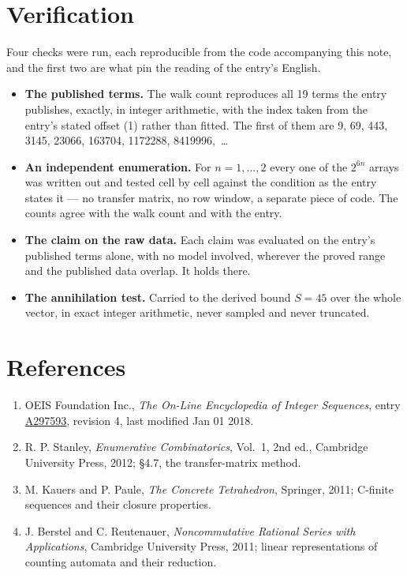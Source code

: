 \documentclass[11pt]{article}
\theoremstyle{definition}
\begin{document}
\section{Verification}

Four checks were run, each reproducible from the code accompanying this note, and the first two are what pin the reading of the entry's English.

\begin{itemize}

\item {\bfseries The published terms.} The walk count reproduces all 19 terms the entry publishes, exactly, in integer arithmetic, with the index taken from the entry's stated offset (1) rather than fitted. The first of them are 9, 69, 443, 3145, 23066, 163704, 1172288, 8419996,~\dots

\item {\bfseries An independent enumeration.} For $n = 1,\dots,2$ every one of the $2^{6n}$ arrays was written out and tested cell by cell against the condition as the entry states it --- no transfer matrix, no row window, a separate piece of code. The counts agree with the walk count and with the entry.

\item {\bfseries The claim on the raw data.} Each claim was evaluated on the entry's published terms alone, with no model involved, wherever the proved range and the published data overlap. It holds there.

\item {\bfseries The annihilation test.} Carried to the derived bound $S = 45$ over the whole vector, in exact integer arithmetic, never sampled and never truncated.

\end{itemize}

\section{References}

\begin{enumerate}

\item OEIS Foundation Inc., \emph{The On-Line Encyclopedia of Integer Sequences}, entry \href{https://oeis.org/A297593}{A297593}, revision 4, last modified Jan 01 2018.

\item R. P. Stanley, \emph{Enumerative Combinatorics}, Vol.~1, 2nd ed., Cambridge University Press, 2012; \S4.7, the transfer-matrix method.

\item M. Kauers and P. Paule, \emph{The Concrete Tetrahedron}, Springer, 2011; C-finite sequences and their closure properties.

\item J. Berstel and C. Reutenauer, \emph{Noncommutative Rational Series with Applications}, Cambridge University Press, 2011; linear representations of counting automata and their reduction.

\end{enumerate}
\end{document}
